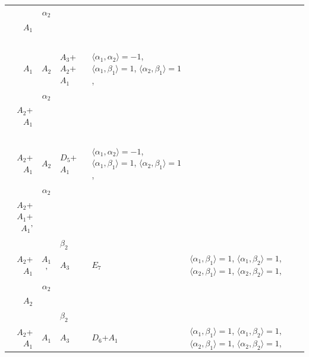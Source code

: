 \documentclass[12pt]{report}
\begin{document}
\begin{appendix}
{\begin{longtable}{rcl p{1cm}p{1cm}p{3cm} }
\\
\begin{tabular}{cc}$\alpha_1$+ & $\alpha_2$\\\tiny{ $A_1$ } & \tiny{  }\end{tabular} &\begin{tabular}{c} = \\~ \end{tabular} & \begin{tabular}{c}$\beta_1$\\\tiny{ $A_1$ }\end{tabular} & $A_2$ & $A_3$+$A_2$+$A_1$ & $\langle\alpha_1, \alpha_2\rangle=-1$,  $\langle\alpha_1, \beta_1\rangle=1$, $\langle\alpha_2, \beta_1\rangle=1$, 
\\
\begin{tabular}{cc}$\alpha_1$+ & $\alpha_2$\\\tiny{ $A_2$+$A_1$ } & \tiny{  }\end{tabular} &\begin{tabular}{c} = \\~ \end{tabular} & \begin{tabular}{c}$\beta_1$\\\tiny{ $A_2$+$A_1$ }\end{tabular} & $A_2$ & $D_5$+$A_1$ & $\langle\alpha_1, \alpha_2\rangle=-1$,  $\langle\alpha_1, \beta_1\rangle=1$, $\langle\alpha_2, \beta_1\rangle=1$, 
\\
\begin{tabular}{cc}$\alpha_1$+ & $\alpha_2$\\\tiny{ $A_2$+$A_1$+$A_1$' } & \tiny{  }\end{tabular} &\begin{tabular}{c} = \\~ \end{tabular} & \begin{tabular}{cc}$\beta_1$+ & $\beta_2$\\\tiny{ $A_2$+$A_1$ } & \tiny{ $A_1$' }\end{tabular} & $A_3$ & $E_7$ &  $\langle\alpha_1, \beta_1\rangle=1$, $\langle\alpha_1, \beta_2\rangle=1$, $\langle\alpha_2, \beta_1\rangle=1$, $\langle\alpha_2, \beta_2\rangle=1$, 
\\
\begin{tabular}{cc}$\alpha_1$+ & $\alpha_2$\\\tiny{ $A_2$ } & \tiny{  }\end{tabular} &\begin{tabular}{c} = \\~ \end{tabular} & \begin{tabular}{cc}$\beta_1$+ & $\beta_2$\\\tiny{ $A_2$+$A_1$ } & \tiny{ $A_1$ }\end{tabular} & $A_3$ & $D_6$+$A_1$ &  $\langle\alpha_1, \beta_1\rangle=1$, $\langle\alpha_1, \beta_2\rangle=1$, $\langle\alpha_2, \beta_1\rangle=1$, $\langle\alpha_2, \beta_2\rangle=1$, 

\end{longtable}}
\end{appendix}
\end{document}
